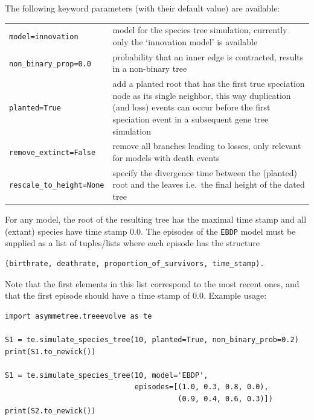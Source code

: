 \documentclass[hidelinks,11pt]{article}
\newcommand{\sq}{\textquotesingle}
\begin{document}
\noindent
The following keyword parameters (with their default value) are available:

\vspace{3mm}
{\small\centering
\begin{longtable}{ p{3.5cm} p{10cm} }
	\texttt{model=\sq innovation\sq}  & model for the species tree simulation,
	currently only the `innovation model' is available\\
	\texttt{non\_binary\_prop=0.0} & probability that an inner edge is contracted,
	results in a non-binary tree\\
	\texttt{planted=True} & add a planted root that has the first true speciation node as its
	single neighbor, this way duplication (and loss) events can occur before the first speciation event in a subsequent gene tree simulation\\
	\texttt{remove\_extinct=\newline False} & remove all branches leading to losses, only relevant for models with death events\\
	\texttt{rescale\_to\_height=\newline None} & specify the divergence time between the (planted) root and the leaves i.e.\ the final height of the dated tree\\
\end{longtable}
}
\vspace{3mm}

For any model, the root of the resulting tree has the maximal time stamp and all (extant) species have time stamp 0.0.
The episodes of the \texttt{\sq EBDP\sq} model must be supplied as a list of
tuples/lists where each episode has the structure

\begin{adjustwidth}{1cm}{1cm}\vspace{2mm}
\begin{verbatim}
(birthrate, deathrate, proportion_of_survivors, time_stamp).
\end{verbatim}
\end{adjustwidth}

\noindent
Note that the first elements in this list correspond to the most recent ones, and that the first episode should have a time stamp of 0.0.
Example usage:

\begin{adjustwidth}{1cm}{1cm}\vspace{2mm}
\begin{verbatim}
import asymmetree.treeevolve as te

S1 = te.simulate_species_tree(10, planted=True, non_binary_prob=0.2)
print(S1.to_newick())

S1 = te.simulate_species_tree(10, model='EBDP',
                              episodes=[(1.0, 0.3, 0.8, 0.0),
                                        (0.9, 0.4, 0.6, 0.3)])
print(S2.to_newick())
\end{verbatim}
\end{adjustwidth}
\end{document}
